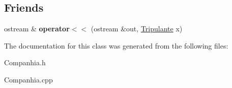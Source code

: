 \subsection*{Friends}
\begin{DoxyCompactItemize}
\item 
\hypertarget{class_tripulante_af23ec1a88e0f09a083f9c8af125ece60}{
ostream \& {\bfseries operator$<$$<$} (ostream \&out, \hyperlink{class_tripulante}{Tripulante} x)}
\label{class_tripulante_af23ec1a88e0f09a083f9c8af125ece60}

\end{DoxyCompactItemize}


The documentation for this class was generated from the following files:\begin{DoxyCompactItemize}
\item 
Companhia.h\item 
Companhia.cpp\end{DoxyCompactItemize}
